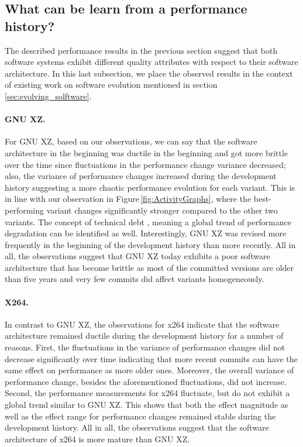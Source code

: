 \subsection{What can be learn from a performance history?}\label{sec:expconc}
The described performance results in the previous section suggest that both
software systems exhibit different quality attributes with respect to their
software architecture. In this last subsection, we place the observed results
in the context of existing work on software evolution mentioned in
section\,\ref{sec:evolving_solftware}.

\paragraph{GNU XZ.} For GNU XZ, based on our observations, we can say that the
software architecture in the beginning was ductile in the beginning and got more brittle
over the time since fluctuations in the performance change variance decreased;
also, the variance of performance changes increased during the development
history suggesting a more chaotic performance evolution for each variant. This
is in line with our observation in Figure\,\ref{fig:ActivityGraphs}, where the
best-performing variant changes significantly stronger compared to the other two variants. The
concept of technical debt \citep{guo_tracking_2011}, meaning a global trend of
performance degradation can be identified as well. Interestingly, GNU XZ was revised
more frequently in the beginning of the development history than more recently.
All in all, the observations suggest that GNU XZ today exhibits a poor software
architecture that has become brittle as most of the committed versions are
older than five years and very few commits did affect variants homogeneously.

\paragraph{X264.} In contrast to GNU XZ, the observations for x264 indicate that
the software architecture remained ductile during the development history for a number of
reasons. First, the fluctuations in the variance of performance changes did not
decrease significantly over time indicating that more recent commits can have
the same effect on performance as more older ones. Moreover, the overall
variance of performance change, besides the aforementioned fluctuations, did
not increase. Second, the performance measurements for x264 fluctuate, but do
not exhibit a global trend similar to GNU XZ. This shows that both the effect
magnitude as well as the effect range for performance changes remained stable
during the development history. All in all, the observations suggest that the software architecture of x264 is
more mature than GNU XZ.

